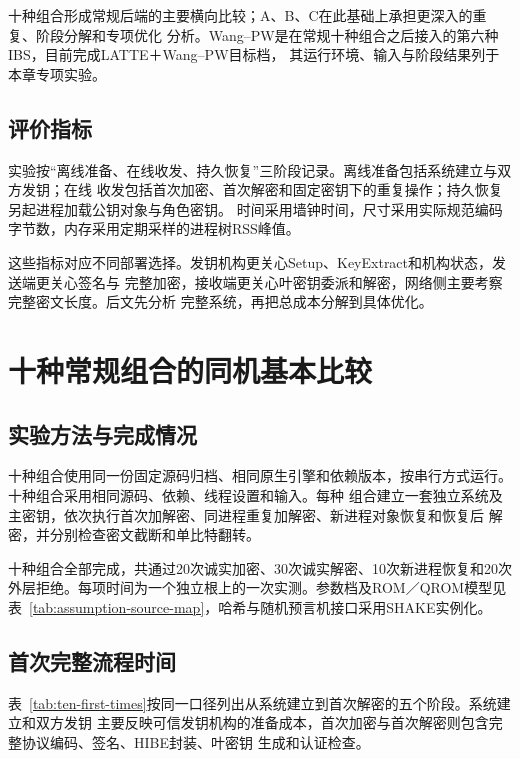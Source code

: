 十种组合形成常规后端的主要横向比较；A、B、C在此基础上承担更深入的重复、阶段分解和专项优化
分析。Wang--PW是在常规十种组合之后接入的第六种IBS，目前完成LATTE＋Wang--PW目标档，
其运行环境、输入与阶段结果列于本章专项实验。

\subsection{评价指标}

实验按“离线准备、在线收发、持久恢复”三阶段记录。离线准备包括系统建立与双方发钥；在线
收发包括首次加密、首次解密和固定密钥下的重复操作；持久恢复另起进程加载公钥对象与角色密钥。
时间采用墙钟时间，尺寸采用实际规范编码字节数，内存采用定期采样的进程树RSS峰值。

这些指标对应不同部署选择。发钥机构更关心Setup、KeyExtract和机构状态，发送端更关心签名与
完整加密，接收端更关心叶密钥委派和解密，网络侧主要考察完整密文长度。后文先分析
完整系统，再把总成本分解到具体优化。

\section{十种常规组合的同机基本比较}

\subsection{实验方法与完成情况}

十种组合使用同一份固定源码归档、相同原生引擎和依赖版本，按串行方式运行。十种组合采用相同源码、依赖、线程设置和输入。每种
组合建立一套独立系统及主密钥，依次执行首次加解密、同进程重复加解密、新进程对象恢复和恢复后
解密，并分别检查密文截断和单比特翻转。

十种组合全部完成，共通过20次诚实加密、30次诚实解密、10次新进程恢复和20次外层拒绝。每项时间为一个独立根上的一次实测。参数档及ROM／QROM模型见表~\ref{tab:assumption-source-map}，哈希与随机预言机接口采用SHAKE实例化。

\subsection{首次完整流程时间}

表~\ref{tab:ten-first-times}按同一口径列出从系统建立到首次解密的五个阶段。系统建立和双方发钥
主要反映可信发钥机构的准备成本，首次加密与首次解密则包含完整协议编码、签名、HIBE封装、叶密钥
生成和认证检查。

